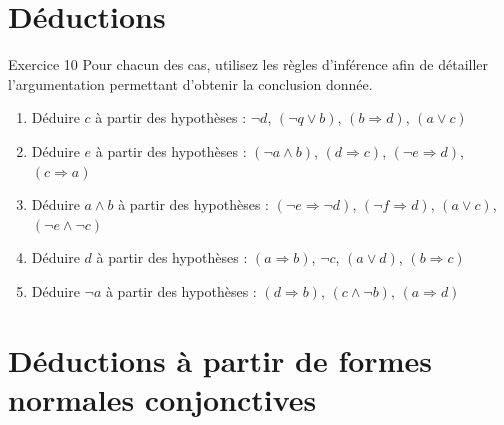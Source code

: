 \documentclass[a4paper,11pt]{article}
\begin{document}
\section{Déductions}

\begin{exercisebox}{Exercice 10}
Pour chacun des cas, utilisez les règles d'inférence afin de détailler l'argumentation permettant d'obtenir la conclusion donnée.

\begin{enumerate}
    \item Déduire $c$ à partir des hypothèses : $\neg d$, $(\neg q \vee b)$, $(b \Rightarrow d)$, $(a \vee c)$
    
    \item Déduire $e$ à partir des hypothèses : $(\neg a \wedge b)$, $(d \Rightarrow c)$, $(\neg e \Rightarrow d)$, $(c \Rightarrow a)$
    
    \item Déduire $a \wedge b$ à partir des hypothèses : $(\neg e \Rightarrow \neg d)$, $(\neg f \Rightarrow d)$, $(a \vee c)$, $(\neg e \wedge \neg c)$
    
    \item Déduire $d$ à partir des hypothèses : $(a \Rightarrow b)$, $\neg c$, $(a \vee d)$, $(b \Rightarrow c)$
    
    \item Déduire $\neg a$ à partir des hypothèses : $(d \Rightarrow b)$, $(c \wedge \neg b)$, $(a \Rightarrow d)$
\end{enumerate}
\end{exercisebox}

\section{Déductions à partir de formes normales conjonctives}
\end{document}
